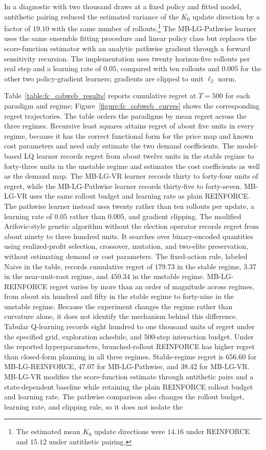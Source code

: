In a diagnostic with two thousand draws at a fixed policy and fitted model, antithetic pairing reduced the estimated variance of the $K_0$ update direction by a factor of $19.10$ with the same number of rollouts.\footnote{The estimated mean $K_0$ update directions were $14.16$ under REINFORCE and $15.12$ under antithetic pairing.}
The MB-LG-Pathwise learner uses the same ensemble fitting procedure and linear policy class but replaces the score-function estimator with an analytic pathwise gradient through a forward sensitivity recursion. The implementation uses twenty horizon-five rollouts per real step and a learning rate of $0.05$, compared with ten rollouts and $0.005$ for the other two policy-gradient learners; gradients are clipped to unit $\ell_2$ norm.

Table~\ref{table:fc_cobweb_results} reports cumulative regret at $T = 500$ for each paradigm and regime; Figure~\ref{figure:fc_cobweb_curves} shows the corresponding regret trajectories. The table orders the paradigms by mean regret across the three regimes. Recursive least squares attains regret of about five units in every regime, because it has the correct functional form for the price map and known cost parameters and need only estimate the two demand coefficients. The model-based LQ learner records regret from about twelve units in the stable regime to forty-three units in the unstable regime and estimates the cost coefficients as well as the demand map. The MB-LG-VR learner records thirty to forty-four units of regret, while the MB-LG-Pathwise learner records thirty-five to forty-seven. MB-LG-VR uses the same rollout budget and learning rate as plain REINFORCE. The pathwise learner instead uses twenty rather than ten rollouts per update, a learning rate of $0.05$ rather than $0.005$, and gradient clipping. The modified Arifovic-style genetic algorithm without the election operator records regret from about ninety to three hundred units. It searches over binary-encoded quantities using realized-profit selection, crossover, mutation, and two-elite preservation, without estimating demand or cost parameters. The fixed-action rule, labeled Naive in the table, records cumulative regret of $179.73$ in the stable regime, $3.37$ in the near-unit-root regime, and $450.34$ in the unstable regime. MB-LG-REINFORCE regret varies by more than an order of magnitude across regimes, from about six hundred and fifty in the stable regime to forty-nine in the unstable regime. Because the experiment changes the regime rather than curvature alone, it does not identify the mechanism behind this difference. Tabular Q-learning records eight hundred to one thousand units of regret under the specified grid, exploration schedule, and 500-step interaction budget. Under the reported hyperparameters, branched-rollout REINFORCE has higher regret than closed-form planning in all three regimes. Stable-regime regret is 656.60 for MB-LG-REINFORCE, 47.07 for MB-LG-Pathwise, and 38.42 for MB-LG-VR. MB-LG-VR modifies the score-function estimate through antithetic pairs and a state-dependent baseline while retaining the plain REINFORCE rollout budget and learning rate. The pathwise comparison also changes the rollout budget, learning rate, and clipping rule, so it does not isolate the 